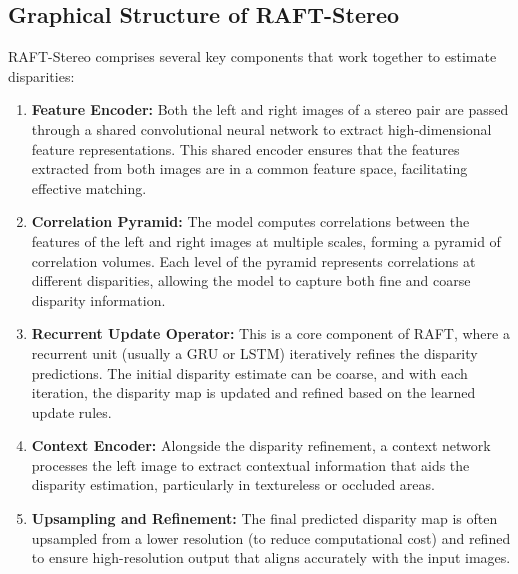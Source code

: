 \documentclass[22pt]{report}
\begin{document}
\subsection{Graphical Structure of RAFT-Stereo}
RAFT-Stereo comprises several key components that work together to estimate disparities:
\begin{enumerate}
    \item \textbf{Feature Encoder:} Both the left and right images of a stereo pair are passed through a shared convolutional neural network to extract high-dimensional feature representations. This shared encoder ensures that the features extracted from both images are in a common feature space, facilitating effective matching.
    \item \textbf{Correlation Pyramid:} The model computes correlations between the features of the left and right images at multiple scales, forming a pyramid of correlation volumes. Each level of the pyramid represents correlations at different disparities, allowing the model to capture both fine and coarse disparity information.
    \item \textbf{Recurrent Update Operator:} This is a core component of RAFT, where a recurrent unit (usually a GRU or LSTM) iteratively refines the disparity predictions. The initial disparity estimate can be coarse, and with each iteration, the disparity map is updated and refined based on the learned update rules.
    \item \textbf{Context Encoder:} Alongside the disparity refinement, a context network processes the left image to extract contextual information that aids the disparity estimation, particularly in textureless or occluded areas.
    \item \textbf{Upsampling and Refinement:} The final predicted disparity map is often upsampled from a lower resolution (to reduce computational cost) and refined to ensure high-resolution output that aligns accurately with the input images.
\end{enumerate}
\vspace{20}
\end{document}
